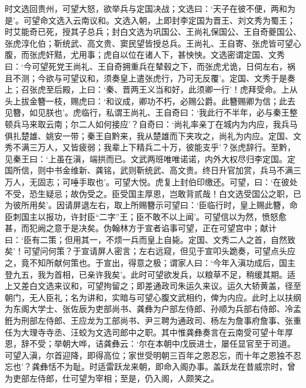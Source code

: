 \documentclass[]{article}
\begin{document}
时文选回贵州，可望大怒，欲举兵与定国决战；文选曰：`天子在彼不便，两和为是'。可望命文选入云南议和。文选入朝，上即封李定国为晋王、刘文秀为蜀王；时艾能奇已死，授其子总兵；封白文选为巩国公、王尚礼保国公、王自奇夔国公、张虎淳化伯；靳统武、高文贵、窦民望皆授总兵。王尚礼、王自寄、张虎皆可望心腹，而张虎奸黠，尤用事；虎自以位在诸人下，甚怏怏。文选密谓定国、文秀曰：`今可望死党王尚礼、王自奇拥重兵在辇毂之下，而张虎尤诡，日伺左右，祸且不测；今欲与可望议和，须奏皇上遣张虎行，乃可无反覆'。定国、文秀于是奏上；召张虎至后殿，上曰：`秦、晋两王义当和好，此须卿一行'！虎拜受命。上从头上拔金簪一枝，赐虎曰：`和议成，卿功不朽，必赐公爵。此簪赐卿为信；此去见簪，如见朕也'。虎临行，私谓王尚礼、王自奇曰：`我此行不半年，必与秦王整顿兵马来取云南；尔二人如何接应'？自奇曰：`尚礼率亲丁在城内为内应，我兵马俱扎楚雄、姚安一带；秦王自黔来，我从楚雄而下夹攻之，尚礼为内应。定国、文秀不满三万人，又皆疲弱；我辈上下精兵二十万，彼能支乎'？张虎辞行。至黔，见秦王曰：`上虽在滇，端拱而已。文武两班唯唯诺诺，内外大权尽归李定国。定国所信，则中书金维新、龚铭，武则靳统武、高文贵。终日升官加赏，兵马不满三万人，无固志；可唾手取也'。可望大悦。虎复上封伯印缴还。可望，曰：`在彼处不受，恐生疑忌；故伪受之。臣受国主厚恩，岂敢背贰哉！白文选受国公之职，已为彼所用矣'。因请屏退左右，取上所赐簪示可望曰：`臣临行时，皇上赐此簪，命臣刺国主以报功，许封臣``二字''王；臣不敢不以上闻'。可望信以为然，愤怒愈甚，而犯阙之意于是决矣。伪翰林方于宣者谄事可望，正在可望宫中；献计曰：`臣有二策；但用其一，不烦一兵而皇上自毙。定国、文秀二人之首，自然致矣'！可望问何策？于宣请屏人密言；左右远窥，但见于宣叩头跪奏，可望点头应之，竟不知所献何策也。于宣出，得意之极；谓家人曰：`今年入滇功成后，国主登九五，我为首相，已亲许我矣'。此时可望欲发兵，以粮草不足，稍缓其期。适上又差白文选来议和，可望拘留之；即差通政司朱运久来议。运久大轿黄盖，径至朝门，无人臣礼；名为讲和，实暗与可望心腹文武相约，俾为内应。此时上以扶纲为东阁大学士、张佐辰为吏部尚书、龚彝为户部左侍郎、孙顺为兵部右侍郎、冷孟銋为刑部左侍郎、王应龙为工部尚书、尹三聘为通政司、杨左为詹事府詹事、张重任为大理寺寺丞、汪蛟为文选司郎中之职。其中惟龚彝奏言在云南受可望十年厚恩，辞不受；举朝大哗，诘龚彝云：`尔在本朝中戊辰进士，屡任显官至于司道。可望入滇，尔首迎降，即得高位；家世受明朝三百年之恩忍忘，而十年之恩独不忍忘也'？龚彝恬不为耻。时适雷跃龙来朝，即命入阁办事。盖跃龙在昔威宗时，曾为吏部左侍郎，仕可望为宰相；至是，仍入阁，人颇笑之。
\end{document}
